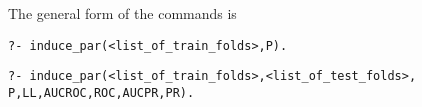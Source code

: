 The general form of the commands is
\begin{verbatim}
?- induce_par(<list_of_train_folds>,P).
\end{verbatim}
\begin{verbatim}
?- induce_par(<list_of_train_folds>,<list_of_test_folds>,
P,LL,AUCROC,ROC,AUCPR,PR).
\end{verbatim}
